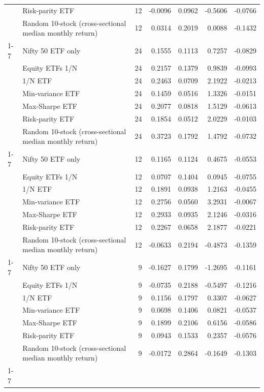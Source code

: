 \begin{table}
\begin{tabular}{llrrrrr}
 & Risk-parity ETF & 12 & -0.0096 & 0.0962 & -0.5606 & -0.0766 \\
 & Random 10-stock (cross-sectional median monthly return) & 12 & 0.0314 & 0.2019 & 0.0088 & -0.1432 \\
\cline{1-7}
\multirow[t]{7}{*}{2023-2024} & Nifty 50 ETF only & 24 & 0.1555 & 0.1113 & 0.7257 & -0.0829 \\
 & Equity ETFs 1/N & 24 & 0.2157 & 0.1379 & 0.9839 & -0.0993 \\
 & 1/N ETF & 24 & 0.2463 & 0.0709 & 2.1922 & -0.0213 \\
 & Min-variance ETF & 24 & 0.1459 & 0.0516 & 1.3326 & -0.0151 \\
 & Max-Sharpe ETF & 24 & 0.2077 & 0.0818 & 1.5129 & -0.0613 \\
 & Risk-parity ETF & 24 & 0.1854 & 0.0512 & 2.0229 & -0.0103 \\
 & Random 10-stock (cross-sectional median monthly return) & 24 & 0.3723 & 0.1792 & 1.4792 & -0.0732 \\
\cline{1-7}
\multirow[t]{7}{*}{2025 tariff shock} & Nifty 50 ETF only & 12 & 0.1165 & 0.1124 & 0.4675 & -0.0553 \\
 & Equity ETFs 1/N & 12 & 0.0707 & 0.1404 & 0.0945 & -0.0755 \\
 & 1/N ETF & 12 & 0.1891 & 0.0938 & 1.2163 & -0.0455 \\
 & Min-variance ETF & 12 & 0.2756 & 0.0560 & 3.2931 & -0.0067 \\
 & Max-Sharpe ETF & 12 & 0.2933 & 0.0935 & 2.1246 & -0.0316 \\
 & Risk-parity ETF & 12 & 0.2267 & 0.0658 & 2.1877 & -0.0221 \\
 & Random 10-stock (cross-sectional median monthly return) & 12 & -0.0633 & 0.2194 & -0.4873 & -0.1359 \\
\cline{1-7}
\multirow[t]{7}{*}{2026 to date} & Nifty 50 ETF only & 9 & -0.1627 & 0.1799 & -1.2695 & -0.1161 \\
 & Equity ETFs 1/N & 9 & -0.0735 & 0.2188 & -0.5497 & -0.1216 \\
 & 1/N ETF & 9 & 0.1156 & 0.1797 & 0.3307 & -0.0627 \\
 & Min-variance ETF & 9 & 0.0698 & 0.1406 & 0.0821 & -0.0537 \\
 & Max-Sharpe ETF & 9 & 0.1899 & 0.2106 & 0.6156 & -0.0586 \\
 & Risk-parity ETF & 9 & 0.0943 & 0.1533 & 0.2357 & -0.0576 \\
 & Random 10-stock (cross-sectional median monthly return) & 9 & -0.0172 & 0.2864 & -0.1649 & -0.1303 \\
\cline{1-7}
\bottomrule
\end{tabular}
\end{table}

